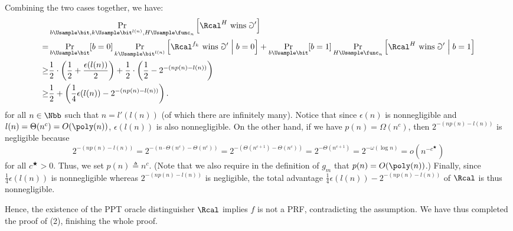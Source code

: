 \begin{answer}[a]
    Combining the two cases together, we have:
    \begin{align*}
        &\Pr_{b\Usample\bit, k\Usample\bit^{l(n)}, H\Usample\func_n}\left[ \Rcal^{H} \textrm{ wins } \Game' \right]\\
        =& \Pr_{b\Usample\bit}[b=0]\Pr_{k\Usample\bit^{l(n)}}\left[ \Rcal^{f_k} \textrm{ wins } \Game' \Bigm\vert b=0\right]
        + \Pr_{b\Usample\bit}[b=1]\Pr_{H\Usample\func_n}\left[ \Rcal^{H} \textrm{ wins } \Game' \Bigm\vert b=1\right]\\
        \ge& \frac{1}{2}\cdot \left(\frac{1}{2}+\frac{\epsilon(l(n))}{2}\right) +\frac{1}{2}\cdot \left(\frac{1}{2} - 2^{-(np(n)-l(n))}\right)\\
        \ge& \frac{1}{2} + \left(\frac{1}{4}\epsilon(l(n))-2^{-(np(n)-l(n))}\right).
    \end{align*}
    for all $n\in\Nbb$ such that $n=l'(l(n))$ (of which there are infinitely many).
    Notice that since $\epsilon(n)$ is nonnegligible and $l(n)=\Theta(n^c)=O(\poly(n))$, $\epsilon(l(n))$ is also nonnegligible. On the other hand, if we have $p(n)=\Omega(n^c)$, then $2^{-(np(n)-l(n))}$ is negligible because
    \[
        2^{-(np(n)-l(n))} 
        = 2^{-(n\cdot \Theta(n^c)-\Theta(n^c))}
        =2^{-(\Theta(n^{c+1})-\Theta(n^c))}
        =2^{-\Theta(n^{c+1})}
        =2^{-\omega(\log n)}
        =o(n^{-c^\bigstar})
    \]
    for all $c^\bigstar\gt 0$. Thus, we set $p(n)\triangleq n^c$. (Note that we also require in the definition of $g_m$ that $p(n)=O(\poly(n))$.) Finally, since $\frac{1}{4}\epsilon(l(n))$ is nonnegligible whereas $2^{-(np(n)-l(n))}$ is negligible, the total advantage $\frac{1}{4}\epsilon(l(n))-2^{-(np(n)-l(n))}$ of $\Rcal$ is thus nonnegligible.

    Hence, the existence of the PPT oracle distinguisher $\Rcal$ implies $f$ is not a PRF, contradicting the assumption. We have thus completed the proof of (2), finishing the whole proof.
\end{answer}

























